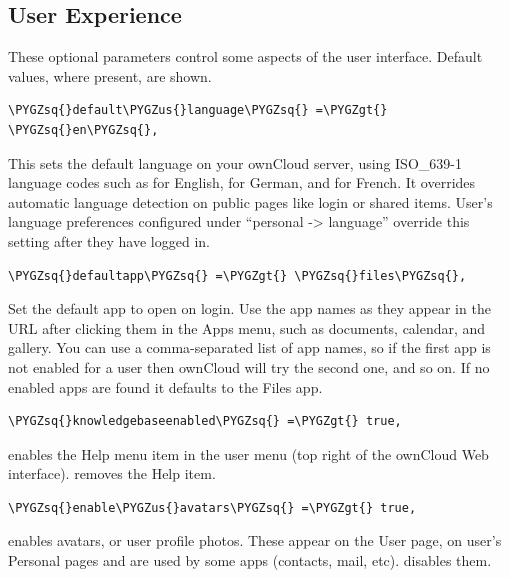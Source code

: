 \documentclass[letterpaper,10pt,english]{sphinxmanual}
\def\PYGZus{\char`\_}
\def\PYGZgt{\char`\>}
\def\PYGZsq{\char`\'}
\renewcommand\PYGZsq{\textquotesingle}
\begin{document}
\subsection{User Experience}
\label{configuration_server/config_sample_php_parameters:user-experience}
These optional parameters control some aspects of the user interface. Default
values, where present, are shown.

\begin{Verbatim}[commandchars=\\\{\}]
\PYGZsq{}default\PYGZus{}language\PYGZsq{} =\PYGZgt{} \PYGZsq{}en\PYGZsq{},
\end{Verbatim}

This sets the default language on your ownCloud server, using ISO\_639-1
language codes such as  for English,  for German, and  for
French. It overrides automatic language detection on public pages like login
or shared items. User's language preferences configured under ``personal -\textgreater{}
language'' override this setting after they have logged in.

\begin{Verbatim}[commandchars=\\\{\}]
\PYGZsq{}defaultapp\PYGZsq{} =\PYGZgt{} \PYGZsq{}files\PYGZsq{},
\end{Verbatim}

Set the default app to open on login. Use the app names as they appear in the
URL after clicking them in the Apps menu, such as documents, calendar, and
gallery. You can use a comma-separated list of app names, so if the first
app is not enabled for a user then ownCloud will try the second one, and so
on. If no enabled apps are found it defaults to the Files app.

\begin{Verbatim}[commandchars=\\\{\}]
\PYGZsq{}knowledgebaseenabled\PYGZsq{} =\PYGZgt{} true,
\end{Verbatim}

 enables the Help menu item in the user menu (top right of the
ownCloud Web interface).  removes the Help item.

\begin{Verbatim}[commandchars=\\\{\}]
\PYGZsq{}enable\PYGZus{}avatars\PYGZsq{} =\PYGZgt{} true,
\end{Verbatim}

 enables avatars, or user profile photos. These appear on the User
page, on user's Personal pages and are used by some apps (contacts, mail,
etc).  disables them.
\end{document}
